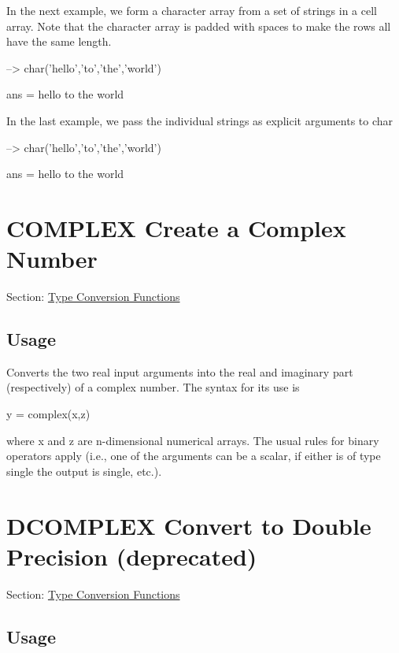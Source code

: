 In the next example, we form a character array from a set of strings in a cell array. Note that the character array is padded with spaces to make the rows all have the same length.


\begin{DoxyVerbInclude}
--> char({'hello','to','the','world'})

ans = 
hello
to   
the  
world
\end{DoxyVerbInclude}


In the last example, we pass the individual strings as explicit arguments to {\ttfamily char}


\begin{DoxyVerbInclude}
--> char('hello','to','the','world')

ans = 
hello
to   
the  
world
\end{DoxyVerbInclude}
 \hypertarget{typecast_complex}{}\section{C\-O\-M\-P\-L\-E\-X Create a Complex Number}\label{typecast_complex}
Section\-: \hyperlink{sec_typecast}{Type Conversion Functions} \hypertarget{vtkwidgets_vtkxyplotwidget_Usage}{}\subsection{Usage}\label{vtkwidgets_vtkxyplotwidget_Usage}
Converts the two real input arguments into the real and imaginary part (respectively) of a complex number. The syntax for its use is \begin{DoxyVerb}   y = complex(x,z)
\end{DoxyVerb}
 where {\ttfamily x} and {\ttfamily z} are {\ttfamily n}-\/dimensional numerical arrays. The usual rules for binary operators apply (i.\-e., one of the arguments can be a scalar, if either is of type {\ttfamily single} the output is single, etc.). \hypertarget{typecast_dcomplex}{}\section{D\-C\-O\-M\-P\-L\-E\-X Convert to Double Precision (deprecated)}\label{typecast_dcomplex}
Section\-: \hyperlink{sec_typecast}{Type Conversion Functions} \hypertarget{vtkwidgets_vtkxyplotwidget_Usage}{}\subsection{Usage}\label{vtkwidgets_vtkxyplotwidget_Usage}
